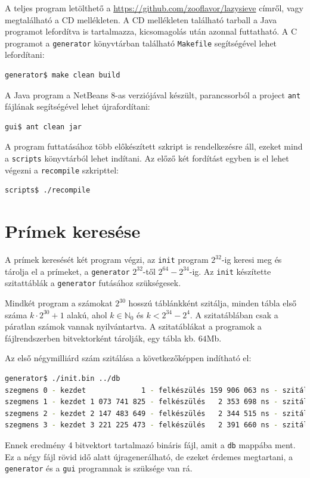A teljes program letölthető a \url{https://github.com/zooflavor/lazysieve} címről, vagy megtalálható a CD mellékleten.
A CD mellékleten található tarball a Java programot lefordítva is tartalmazza, kicsomagolás után azonnal futtatható.
A C programot a \texttt{generator} könyvtárban található \texttt{Makefile} segítségével lehet lefordítani:
\begin{lstlisting}[language=bash]
generator$ make clean build
\end{lstlisting}

A Java program a NetBeans 8-as verziójával készült,
parancssorból a project \texttt{ant} fájlának segítségével lehet újrafordítani:
\begin{lstlisting}[language=bash]
gui$ ant clean jar
\end{lstlisting}

A program futtatásához több előkészített szkript is rendelkezésre áll, ezeket mind a \texttt{scripts} könyvtárból lehet indítani.
Az előző két fordítást egyben is el lehet végezni a \texttt{recompile} szkripttel:
\begin{lstlisting}[language=bash]
scripts$ ./recompile
\end{lstlisting}

\section{Prímek keresése}

A prímek keresését két program végzi, az \texttt{init} program $2^{32}$-ig keresi meg és tárolja el a prímeket, a \texttt{generator} $2^{32}$-től $2^{64}-2^{34}$-ig.
Az \texttt{init} készítette szitattáblák a \texttt{generator} futásához szükségesek.

Mindkét program a számokat $2^{30}$ hosszú táblánkként szitálja, minden tábla első száma $k \cdot 2^{30}+1$ alakú, ahol $k \in \mathbb{N}_0$ és $k < 2^{34}-2^{4}$.
A szitatáblában csak a páratlan számok vannak nyilvántartva.
A szitatáblákat a programok a fájlrendszerben bitvektorként tárolják, egy tábla kb. $64$Mb.

Az első négymilliárd szám szitálása a következőképpen indítható el:
\begin{lstlisting}[language=bash]
generator$ ./init.bin ../db
szegmens 0 - kezdet             1 - felkészülés 159 906 063 ns - szitálás 1 122 878 403 ns
szegmens 1 - kezdet 1 073 741 825 - felkészülés   2 353 698 ns - szitálás 1 171 101 336 ns
szegmens 2 - kezdet 2 147 483 649 - felkészülés   2 344 515 ns - szitálás 1 188 330 478 ns
szegmens 3 - kezdet 3 221 225 473 - felkészülés   2 391 660 ns - szitálás 1 199 900 603 ns
\end{lstlisting}
Ennek eredmény 4 bitvektort tartalmazó bináris fájl, amit a \texttt{db} mappába ment.
Ez a négy fájl rövid idő alatt újragenerálható, de ezeket érdemes megtartani, a \texttt{generator} és a \texttt{gui} programnak is szüksége van rá.

